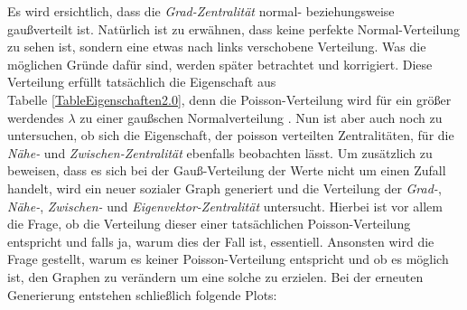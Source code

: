 Es wird ersichtlich, dass die \textit{Grad-Zentralität} normal- beziehungsweise gaußverteilt ist. Natürlich ist zu erwähnen, dass keine perfekte Normal-Verteilung zu sehen ist, sondern eine etwas nach links verschobene Verteilung. Was die möglichen Gründe dafür sind, werden später betrachtet und korrigiert. Diese Verteilung erfüllt tatsächlich die Eigenschaft aus \\
Tabelle \ref{TableEigenschaften2.0}, denn die Poisson-Verteilung wird für ein größer werdendes $\lambda$ zu einer gaußschen Normalverteilung \cite{Poisson}. Nun ist aber auch noch zu untersuchen, ob sich die Eigenschaft, der  poisson verteilten Zentralitäten, für die \textit{Nähe-} und \textit{Zwischen-Zentralität} ebenfalls beobachten lässt. Um zusätzlich zu beweisen, dass es sich bei der Gauß-Verteilung der Werte nicht um einen Zufall handelt, wird ein neuer sozialer Graph generiert und die Verteilung der \textit{Grad-}, \textit{Nähe-}, \textit{Zwischen-} und \textit{Eigenvektor-Zentralität} untersucht. Hierbei ist vor allem die Frage, ob die Verteilung dieser einer tatsächlichen Poisson-Verteilung entspricht und falls ja, warum dies der Fall ist, essentiell. Ansonsten wird die Frage gestellt, warum es keiner Poisson-Verteilung entspricht und ob es möglich ist, den Graphen zu verändern um eine solche zu erzielen. Bei der erneuten Generierung entstehen schließlich folgende Plots:

